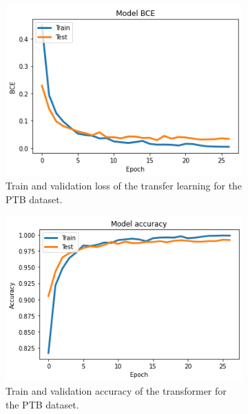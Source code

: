 \documentclass[11pt]{scrartcl}
\begin{document}
\begin{figure}[H]
	\centering
	\begin{subfigure}{.47\textwidth}
		\centering
		\includegraphics[width=.95\linewidth]{../models_performance_graphs/ptb/transf_ptb_accuracy.png}  
		\caption{Train and validation loss of the transfer learning for the PTB dataset.}
	\end{subfigure}
	\begin{subfigure}{.47\textwidth}
		\centering
		\includegraphics[width=.95\linewidth]{../models_performance_graphs/ptb/transf_ptb_loss.png}  
		\caption{Train and validation accuracy of the transformer for the PTB dataset.}
	\end{subfigure}
	\label{FIGURE LABEL 2}
	\caption{}
\end{figure}


\end{document}
